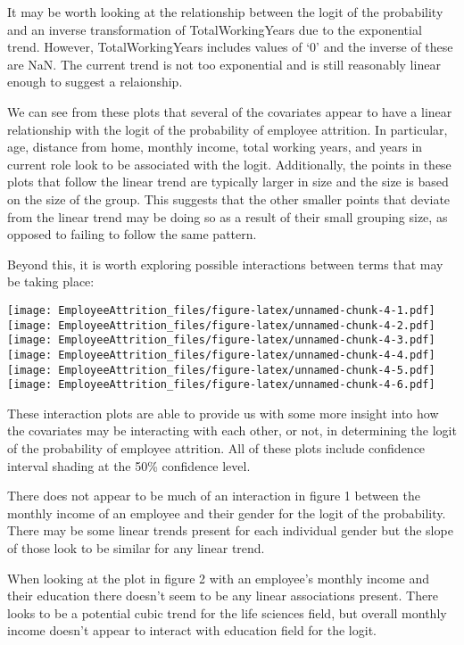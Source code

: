 \documentclass[]{article}
\begin{document}
It may be worth looking at the relationship between the logit of the
probability and an inverse transformation of TotalWorkingYears due to
the exponential trend. However, TotalWorkingYears includes values of `0'
and the inverse of these are NaN. The current trend is not too
exponential and is still reasonably linear enough to suggest a
relaionship.

We can see from these plots that several of the covariates appear to
have a linear relationship with the logit of the probability of employee
attrition. In particular, age, distance from home, monthly income, total
working years, and years in current role look to be associated with the
logit. Additionally, the points in these plots that follow the linear
trend are typically larger in size and the size is based on the size of
the group. This suggests that the other smaller points that deviate from
the linear trend may be doing so as a result of their small grouping
size, as opposed to failing to follow the same pattern.

Beyond this, it is worth exploring possible interactions between terms
that may be taking place:

\texttt{[image: EmployeeAttrition\_files/figure-latex/unnamed-chunk-4-1.pdf]}
\texttt{[image: EmployeeAttrition\_files/figure-latex/unnamed-chunk-4-2.pdf]}
\texttt{[image: EmployeeAttrition\_files/figure-latex/unnamed-chunk-4-3.pdf]}
\texttt{[image: EmployeeAttrition\_files/figure-latex/unnamed-chunk-4-4.pdf]}
\texttt{[image: EmployeeAttrition\_files/figure-latex/unnamed-chunk-4-5.pdf]}
\texttt{[image: EmployeeAttrition\_files/figure-latex/unnamed-chunk-4-6.pdf]}

These interaction plots are able to provide us with some more insight
into how the covariates may be interacting with each other, or not, in
determining the logit of the probability of employee attrition. All of
these plots include confidence interval shading at the 50\% confidence
level.

There does not appear to be much of an interaction in figure 1 between
the monthly income of an employee and their gender for the logit of the
probability. There may be some linear trends present for each individual
gender but the slope of those look to be similar for any linear trend.

When looking at the plot in figure 2 with an employee's monthly income
and their education there doesn't seem to be any linear associations
present. There looks to be a potential cubic trend for the life sciences
field, but overall monthly income doesn't appear to interact with
education field for the logit.
\end{document}
